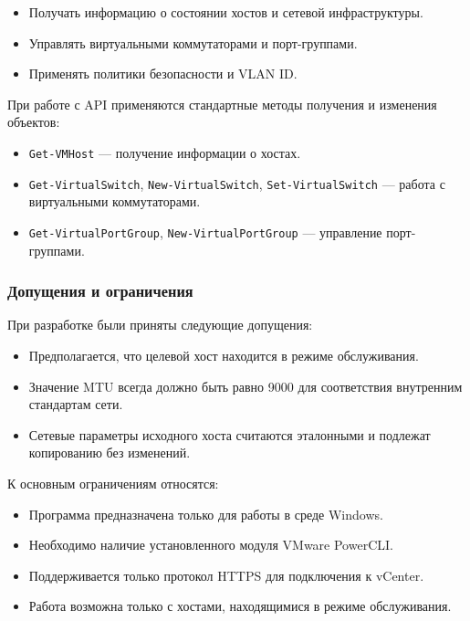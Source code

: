 \begin{itemize}
    \item Получать информацию о состоянии хостов и сетевой инфраструктуры.
    \item Управлять виртуальными коммутаторами и порт-группами.
    \item Применять политики безопасности и VLAN ID.
\end{itemize}

При работе с API применяются стандартные методы получения и изменения объектов:

\begin{itemize}
    \item \texttt{Get-VMHost} — получение информации о хостах.
    \item \texttt{Get-VirtualSwitch}, \texttt{New-VirtualSwitch}, \texttt{Set-VirtualSwitch} — работа с виртуальными коммутаторами.
    \item \texttt{Get-VirtualPortGroup}, \texttt{New-VirtualPortGroup} — управление порт-группами.
\end{itemize}

\subsubsection{Допущения и ограничения}
При разработке были приняты следующие допущения:

\begin{itemize}
    \item Предполагается, что целевой хост находится в режиме обслуживания.
    \item Значение MTU всегда должно быть равно 9000 для соответствия внутренним стандартам сети.
    \item Сетевые параметры исходного хоста считаются эталонными и подлежат копированию без изменений.
\end{itemize}

К основным ограничениям относятся:

\begin{itemize}
    \item Программа предназначена только для работы в среде Windows.
    \item Необходимо наличие установленного модуля VMware PowerCLI.
    \item Поддерживается только протокол HTTPS для подключения к vCenter.
    \item Работа возможна только с хостами, находящимися в режиме обслуживания.
\end{itemize}


